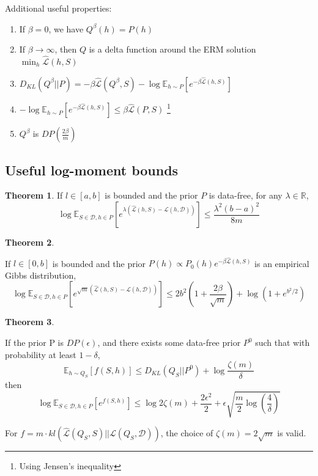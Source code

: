 \documentclass{article}
\theoremstyle{definition}
\newtheorem{theorem}{Theorem}[section]
\newcommand{\Expect}[2]{\mathbb{E}_{#1}\left [#2 \right ]}
\begin{document}
Additional useful properties:
\begin{enumerate}
	\item If $\beta=0$, we have $Q^\beta(h)=P(h)$
	\item If $\beta\rightarrow \infty$, then $Q$ is a delta function around the ERM solution $\min_h \hat{\mathcal{L}}(h,S)$
	\item $D_{KL}(Q^\beta||P)=-\beta\hat{\mathcal{L}}(Q^\beta, S)-\log\Expect{h\sim P}{e^{-\beta \hat{\mathcal{L}}(h, S)}}$
	\item $-\log\Expect{h\sim P}{e^{-\beta \hat{\mathcal{L}}(h, S)}}\leq \beta\hat{\mathcal{L}}(P,S)$ \footnote{Using Jensen's inequality}
	\item $Q^\beta$ is $DP(\frac{2\beta}{m})$ \citep{McSherry2007}
\end{enumerate}

\subsection{Useful log-moment bounds} \label{append:log-moment-stuff}
\begin{theorem}
	If $l\in[a,b]$ is bounded and the prior $P$ is data-free, for any $\lambda\in \mathbb{R}$,
	$$\log \Expect{S\in \mathcal{D}, h\in P}{e^{\lambda(\hat{\mathcal{L}}(h,S)-\mathcal{L}(h,\mathcal{D}))}} \leq \frac{\lambda^2(b-a)^2}{8m}$$
\end{theorem}

\begin{theorem} \citep{Rivasplata2020}
	
	If $l\in[0,b]$ is bounded and the prior $P(h)\propto P_0(h)e^{-\beta\hat{\mathcal{L}}(h,S)}$ is an empirical Gibbs distribution, 
	$$\log \Expect{S\in \mathcal{D}, h\in P}{e^{\sqrt{m}(\hat{\mathcal{L}}(h,S)-\mathcal{L}(h,\mathcal{D}))}} \leq 2b^2(1+\frac{2\beta}{\sqrt{m}})+\log(1+e^{b^2/2})$$
\end{theorem}

\begin{theorem} \citep{Rivasplata2020, Dziugaite2018}
	
	If the prior P is $DP(\epsilon)$, and there exists some data-free prior $P^0$ such that with probability at least $1-\delta$,
	$$\Expect{h\sim Q_S}{f(S,h)} \leq D_{KL}(Q_S||P^0)+\log\frac{\zeta(m)}{\delta}$$
	then 
	$$\log \Expect{S\in \mathcal{D}, h\in P}{e^{f(S,h)}} \leq \log 2\zeta(m) + \frac{2\epsilon^2}{2}+\epsilon\sqrt{\frac{m}{2}\log(\frac{4}{\delta})}$$
	
	For $f=m\cdot kl(\hat{\mathcal{L}}(Q_S,S)||\mathcal{L}(Q_S,\mathcal{D}))$, the choice of $\zeta(m)=2\sqrt{m}$ is valid.
\end{theorem}
\end{document}
